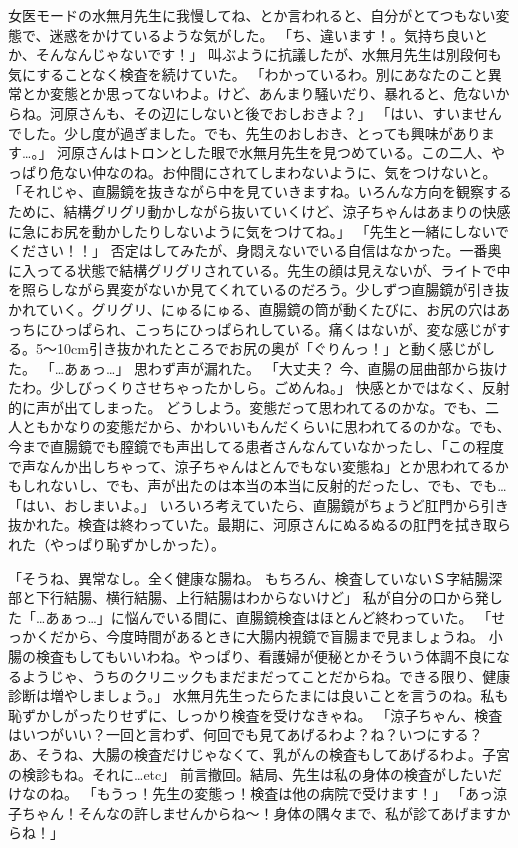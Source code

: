 女医モードの水無月先生に我慢してね、とか言われると、自分がとてつもない変態で、迷惑をかけているような気がした。
「ち、違います！。気持ち良いとか、そんなんじゃないです！」
叫ぶように抗議したが、水無月先生は別段何も気にすることなく検査を続けていた。
「わかっているわ。別にあなたのこと異常とか変態とか思ってないわよ。けど、あんまり騒いだり、暴れると、危ないからね。河原さんも、その辺にしないと後でおしおきよ？」
「はい、すいませんでした。少し度が過ぎました。でも、先生のおしおき、とっても興味があります…。」
河原さんはトロンとした眼で水無月先生を見つめている。この二人、やっぱり危ない仲なのね。お仲間にされてしまわないように、気をつけないと。
「それじゃ、直腸鏡を抜きながら中を見ていきますね。いろんな方向を観察するために、結構グリグリ動かしながら抜いていくけど、涼子ちゃんはあまりの快感に急にお尻を動かしたりしないように気をつけてね。」
「先生と一緒にしないでください！！」
否定はしてみたが、身悶えないでいる自信はなかった。一番奥に入ってる状態で結構グリグリされている。先生の顔は見えないが、ライトで中を照らしながら異変がないか見てくれているのだろう。少しずつ直腸鏡が引き抜かれていく。グリグリ、にゅるにゅる、直腸鏡の筒が動くたびに、お尻の穴はあっちにひっぱられ、こっちにひっぱられしている。痛くはないが、変な感じがする。5～10cm引き抜かれたところでお尻の奥が「ぐりんっ！」と動く感じがした。
「…あぁっ…」
思わず声が漏れた。
「大丈夫？ 今、直腸の屈曲部から抜けたわ。少しびっくりさせちゃったかしら。ごめんね。」
快感とかではなく、反射的に声が出てしまった。
どうしよう。変態だって思われてるのかな。でも、二人ともかなりの変態だから、かわいいもんだくらいに思われてるのかな。でも、今まで直腸鏡でも膣鏡でも声出してる患者さんなんていなかったし、「この程度で声なんか出しちゃって、涼子ちゃんはとんでもない変態ね」とか思われてるかもしれないし、でも、声が出たのは本当の本当に反射的だったし、でも、でも…
「はい、おしまいよ。」
いろいろ考えていたら、直腸鏡がちょうど肛門から引き抜かれた。検査は終わっていた。最期に、河原さんにぬるぬるの肛門を拭き取られた（やっぱり恥ずかしかった）。

「そうね、異常なし。全く健康な腸ね。
もちろん、検査していないＳ字結腸深部と下行結腸、横行結腸、上行結腸はわからないけど」
私が自分の口から発した「…あぁっ…」に悩んでいる間に、直腸鏡検査はほとんど終わっていた。
「せっかくだから、今度時間があるときに大腸内視鏡で盲腸まで見ましょうね。
小腸の検査もしてもいいわね。やっぱり、看護婦が便秘とかそういう体調不良になるようじゃ、うちのクリニックもまだまだってことだからね。できる限り、健康診断は増やしましょう。」
水無月先生ったらたまには良いことを言うのね。私も恥ずかしがったりせずに、しっかり検査を受けなきゃね。
「涼子ちゃん、検査はいつがいい？一回と言わず、何回でも見てあげるわよ？ね？いつにする？
あ、そうね、大腸の検査だけじゃなくて、乳がんの検査もしてあげるわよ。子宮の検診もね。それに…etc」
前言撤回。結局、先生は私の身体の検査がしたいだけなのね。
「もうっ！先生の変態っ！検査は他の病院で受けます！」
「あっ涼子ちゃん！そんなの許しませんからね～！身体の隅々まで、私が診てあげますからね！」



